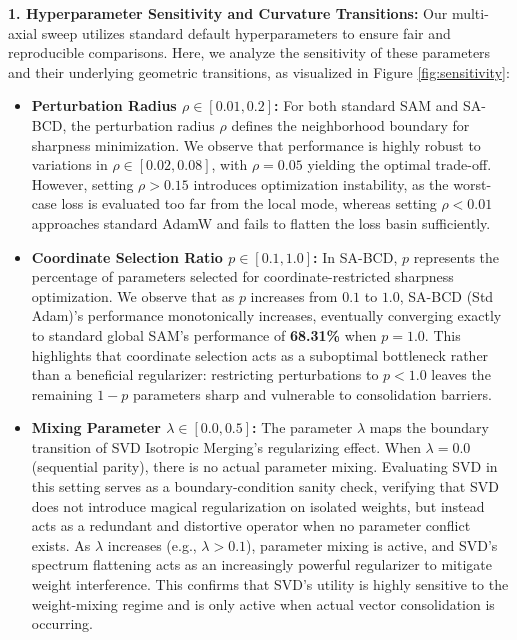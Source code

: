\documentclass{article}
\theoremstyle{plain}
\theoremstyle{definition}
\theoremstyle{remark}
\begin{document}
\textbf{1. Hyperparameter Sensitivity and Curvature Transitions:}
Our multi-axial sweep utilizes standard default hyperparameters to ensure fair and reproducible comparisons. Here, we analyze the sensitivity of these parameters and their underlying geometric transitions, as visualized in Figure \ref{fig:sensitivity}:
\begin{itemize}
  \item \textbf{Perturbation Radius $\rho \in [0.01, 0.2]$:} For both standard SAM and SA-BCD, the perturbation radius $\rho$ defines the neighborhood boundary for sharpness minimization. We observe that performance is highly robust to variations in $\rho \in [0.02, 0.08]$, with $\rho = 0.05$ yielding the optimal trade-off. However, setting $\rho > 0.15$ introduces optimization instability, as the worst-case loss is evaluated too far from the local mode, whereas setting $\rho < 0.01$ approaches standard AdamW and fails to flatten the loss basin sufficiently.
  \item \textbf{Coordinate Selection Ratio $p \in [0.1, 1.0]$:} In SA-BCD, $p$ represents the percentage of parameters selected for coordinate-restricted sharpness optimization. We observe that as $p$ increases from $0.1$ to $1.0$, SA-BCD (Std Adam)'s performance monotonically increases, eventually converging exactly to standard global SAM's performance of \textbf{68.31\%} when $p = 1.0$. This highlights that coordinate selection acts as a suboptimal bottleneck rather than a beneficial regularizer: restricting perturbations to $p < 1.0$ leaves the remaining $1-p$ parameters sharp and vulnerable to consolidation barriers.
  \item \textbf{Mixing Parameter $\lambda \in [0.0, 0.5]$:} The parameter $\lambda$ maps the boundary transition of SVD Isotropic Merging's regularizing effect. When $\lambda = 0.0$ (sequential parity), there is no actual parameter mixing. Evaluating SVD in this setting serves as a boundary-condition sanity check, verifying that SVD does not introduce magical regularization on isolated weights, but instead acts as a redundant and distortive operator when no parameter conflict exists. As $\lambda$ increases (e.g., $\lambda > 0.1$), parameter mixing is active, and SVD's spectrum flattening acts as an increasingly powerful regularizer to mitigate weight interference. This confirms that SVD's utility is highly sensitive to the weight-mixing regime and is only active when actual vector consolidation is occurring.
\end{itemize}
\end{document}
